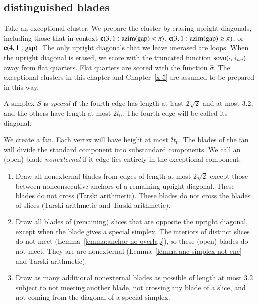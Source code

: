 \subsection{distinguished blades} %

Take an exceptional cluster.  We prepare the cluster by erasing
upright diagonals, including those that in context ${\operatorname{\bf c}}{(3,1: {\operatorname{azim}}({\operatorname{gap}}) <\pi)}$,
${\operatorname{\bf c}}{(3,1: {\operatorname{azim}}({\operatorname{gap}}) \ge \pi)}$, or ${\operatorname{\bf c}}{(4,1:{\operatorname{gap}})}$.  The only upright diagonals that we
leave unerased are loops.  When the upright diagonal is erased, we
score with the truncated function ${\operatorname{sovo}}(\cdot,\lambda_{oct})$ 
away from flat
quarters.  Flat quarters are scored with the function
$\hat\sigma$. The exceptional clusters in this chapter and Chapter~\ref{x-5} 
are assumed to be prepared in this way.


\begin{definition}[special]
A simplex $S$ is {\it special\/} if the fourth edge has length at
least $2\sqrt{2}$ and at most $3.2$, and the others have length at
most $2t_0$. The fourth edge will be called its diagonal.
\end{definition}

We create a fan.  Each vertex will have
height at most $2t_0$.  The blades of the fan
will divide the standard component into substandard components. We
call an (open) blade {\it nonexternal\/} if it
edge lies entirely in the exceptional component.

\begin{enumerate}
\item Draw all nonexternal blades from edges of length at most $2\sqrt{2}$
except those between nonconsecutive anchors of a remaining upright
diagonal. These blades do not cross (Tarski arithmetic).
These blades do not cross the blades of slices
(Tarski arithmetic and
Tarski arithmetic).

\item Draw all blades of (remaining) slices
that are opposite the upright diagonal, except when the blade gives
a special simplex. The interiors of distinct slices do
not meet (Lemma~\ref{lemma:anchor-no-overlap}), so these (open) blades do
not meet. They are are nonexternal 
(Lemma~\ref{lemma:anc-simplex-not-enc} and
Tarski arithmetic).

\item Draw as many additional nonexternal blades as possible of
length at most $3.2$ subject to not meeting another blade, not
crossing any blade of a slice, and not coming from  the
diagonal of a special simplex.
\end{enumerate}

